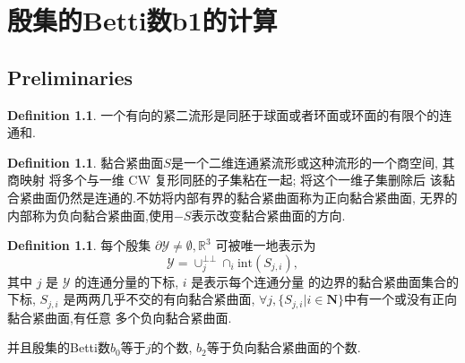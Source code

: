 \documentclass[a4paper]{book}
\makeatletter
\newcommand{\voidenvironment}[1]{%
\expandafter\providecommand\csname env@#1@save@env\endcsname{}%
\expandafter\providecommand\csname env@#1@process\endcsname{}%
\@ifundefined{#1}{}{\RenewEnviron{#1}{}}%
}
\numberwithin{equation}{chapter}
\theoremstyle{definition}
\newtheorem{defn}[thm]{Definition}
\makeatother
\begin{document}
\pagestyle{empty}








\chapter{殷集的Betti数b1的计算}

\section{Preliminaries}

\begin{defn}
    一个有向的紧二流形是同胚于球面或者环面或环面的有限个的连通和.
\end{defn}

\begin{defn}
    黏合紧曲面$S$是一个二维连通紧流形或这种流形的一个商空间, 其商映射
    将多个与一维 CW 复形同胚的子集粘在一起; 将这个一维子集删除后
    该黏合紧曲面仍然是连通的.不妨将内部有界的黏合紧曲面称为正向黏合紧曲面,
    无界的内部称为负向黏合紧曲面,使用$-S$表示改变黏合紧曲面的方向.
\end{defn}

\begin{defn}
    每个殷集 $\partial \mathcal{Y} \not= \emptyset, \mathbb{R}^3$ 可被唯一地表示为
    \begin{equation}
        \mathcal{Y} = \cup^{\bot\bot}_j \cap_i \text{int}(S_{j,i}),
    \end{equation}
    其中 $j$ 是 $\mathcal{Y}$ 的连通分量的下标, $i$ 是表示每个连通分量
    的边界的黏合紧曲面集合的下标, $S_{j,i}$ 是两两几乎不交的有向黏合紧曲面,
    $\forall j, \{{S_{j,i}} | i \in \mathbf{N}\}$中有一个或没有正向黏合紧曲面,有任意
    多个负向黏合紧曲面.

    并且殷集的Betti数$b_{0}$等于$j$的个数, $b_2$等于负向黏合紧曲面的个数.
\end{defn}
\end{document}
